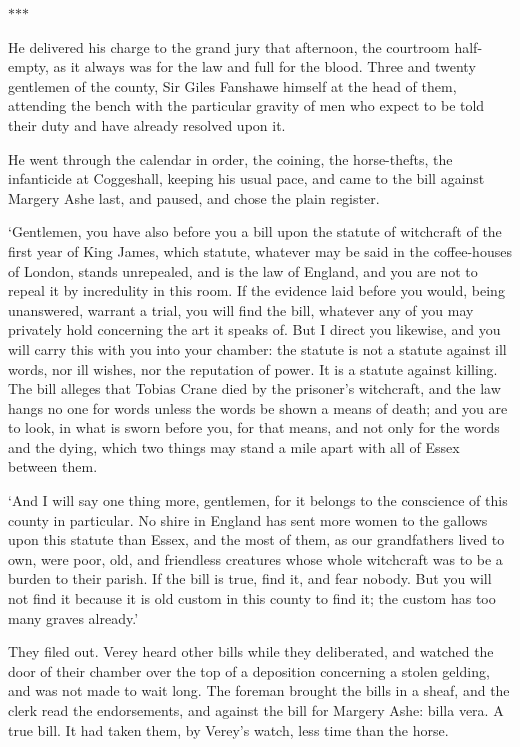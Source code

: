 \documentclass[11pt]{article}
\newcommand{\scenebreak}{%
  \par\vspace{1.1\baselineskip}%
  {\centering $\ast$\quad$\ast$\quad$\ast$\par}%
  \vspace{1.1\baselineskip}\noindent}
\begin{document}
\scenebreak
\noindent He delivered his charge to the grand jury that afternoon, the courtroom half-empty, as it always was for the law and full for the blood. Three and twenty gentlemen of the county, Sir Giles Fanshawe himself at the head of them, attending the bench with the particular gravity of men who expect to be told their duty and have already resolved upon it.

He went through the calendar in order, the coining, the horse-thefts, the infanticide at Coggeshall, keeping his usual pace, and came to the bill against Margery Ashe last, and paused, and chose the plain register.

`Gentlemen, you have also before you a bill upon the statute of witchcraft of the first year of King James, which statute, whatever may be said in the coffee-houses of London, stands unrepealed, and is the law of England, and you are not to repeal it by incredulity in this room. If the evidence laid before you would, being unanswered, warrant a trial, you will find the bill, whatever any of you may privately hold concerning the art it speaks of. But I direct you likewise, and you will carry this with you into your chamber: the statute is not a statute against ill words, nor ill wishes, nor the reputation of power. It is a statute against killing. The bill alleges that Tobias Crane died by the prisoner's witchcraft, and the law hangs no one for words unless the words be shown a means of death; and you are to look, in what is sworn before you, for that means, and not only for the words and the dying, which two things may stand a mile apart with all of Essex between them.

`And I will say one thing more, gentlemen, for it belongs to the conscience of this county in particular. No shire in England has sent more women to the gallows upon this statute than Essex, and the most of them, as our grandfathers lived to own, were poor, old, and friendless creatures whose whole witchcraft was to be a burden to their parish. If the bill is true, find it, and fear nobody. But you will not find it because it is old custom in this county to find it; the custom has too many graves already.'

They filed out. Verey heard other bills while they deliberated, and watched the door of their chamber over the top of a deposition concerning a stolen gelding, and was not made to wait long. The foreman brought the bills in a sheaf, and the clerk read the endorsements, and against the bill for Margery Ashe: billa vera. A true bill. It had taken them, by Verey's watch, less time than the horse.
\end{document}
